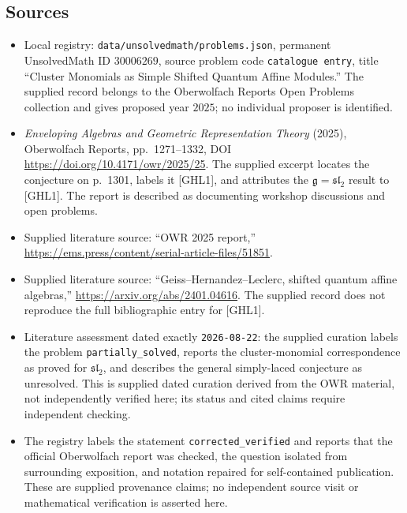 \documentclass[11pt]{article}
\begin{document}
\subsection{Sources}
\begin{itemize}
\item Local registry: \texttt{data/unsolvedmath/problems.json}, permanent UnsolvedMath ID \(30006269\), source problem code \texttt{catalogue entry}, title ``Cluster Monomials as Simple Shifted Quantum Affine Modules.'' The supplied record belongs to the Oberwolfach Reports Open Problems collection and gives proposed year \(2025\); no individual proposer is identified.
\item \emph{Enveloping Algebras and Geometric Representation Theory} (2025), Oberwolfach Reports, pp.~1271--1332, DOI \url{https://doi.org/10.4171/owr/2025/25}. The supplied excerpt locates the conjecture on p.~1301, labels it [GHL1], and attributes the \(\mathfrak g=\mathfrak{sl}_2\) result to [GHL1]. The report is described as documenting workshop discussions and open problems.
\item Supplied literature source: ``OWR 2025 report,'' \url{https://ems.press/content/serial-article-files/51851}.
\item Supplied literature source: ``Geiss--Hernandez--Leclerc, shifted quantum affine algebras,'' \url{https://arxiv.org/abs/2401.04616}. The supplied record does not reproduce the full bibliographic entry for [GHL1].
\item Literature assessment dated exactly \texttt{2026-08-22}: the supplied curation labels the problem \texttt{partially\_solved}, reports the cluster-monomial correspondence as proved for \(\mathfrak{sl}_2\), and describes the general simply-laced conjecture as unresolved. This is supplied dated curation derived from the OWR material, not independently verified here; its status and cited claims require independent checking.
\item The registry labels the statement \texttt{corrected\_verified} and reports that the official Oberwolfach report was checked, the question isolated from surrounding exposition, and notation repaired for self-contained publication. These are supplied provenance claims; no independent source visit or mathematical verification is asserted here.
\end{itemize}
\end{document}
